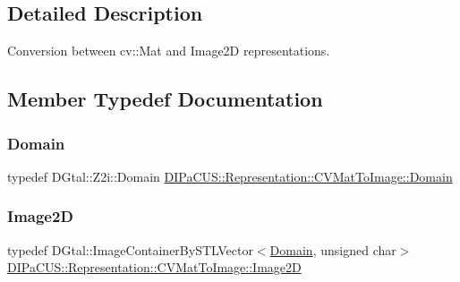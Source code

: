 \subsection{Detailed Description}
Conversion between cv\+::\+Mat and Image2D representations. 



\subsection{Member Typedef Documentation}
\mbox{\label{structDIPaCUS_1_1Representation_1_1CVMatToImage_a5d9aec8c9bd96fa66e4f7ed3a8feac02}} 
\subsubsection{\texorpdfstring{Domain}{Domain}}
{\footnotesize\ttfamily typedef D\+Gtal\+::\+Z2i\+::\+Domain \mbox{\hyperlink{structDIPaCUS_1_1Representation_1_1CVMatToImage_a5d9aec8c9bd96fa66e4f7ed3a8feac02}{D\+I\+Pa\+C\+U\+S\+::\+Representation\+::\+C\+V\+Mat\+To\+Image\+::\+Domain}}}

\mbox{\label{structDIPaCUS_1_1Representation_1_1CVMatToImage_a3e6b8dea7273472226dfb9d161e7ee26}} 
\subsubsection{\texorpdfstring{Image2D}{Image2D}}
{\footnotesize\ttfamily typedef D\+Gtal\+::\+Image\+Container\+By\+S\+T\+L\+Vector$<$\mbox{\hyperlink{structDIPaCUS_1_1Representation_1_1CVMatToImage_a5d9aec8c9bd96fa66e4f7ed3a8feac02}{Domain}}, unsigned char$>$ \mbox{\hyperlink{structDIPaCUS_1_1Representation_1_1CVMatToImage_a3e6b8dea7273472226dfb9d161e7ee26}{D\+I\+Pa\+C\+U\+S\+::\+Representation\+::\+C\+V\+Mat\+To\+Image\+::\+Image2D}}}


